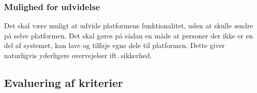\subsubsection{Mulighed for udvidelse}
Det skal være muligt at udvide platformens funktionalitet, uden at skulle ændre på selve platformen.
Det skal gøres på sådan en måde at personer der ikke er en del af systemet, kan lave og tilføje egne dele til platformen.
Dette giver naturligvis yderligere overvejelser ift. sikkerhed.

\subsection{Evaluering af kriterier}

